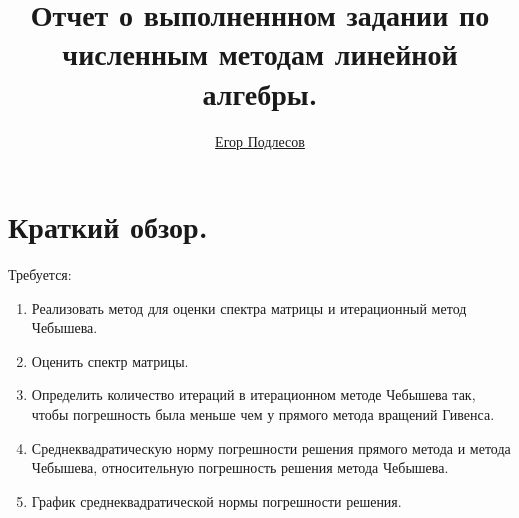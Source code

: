 \documentclass[a4paper,12pt]{article}
\author{\href{https://github.com/ypodlesov}{Егор Подлесов}}
\title{Отчет о выполненнном задании по численным методам линейной алгебры.}
\begin{document}
\maketitle
\clearpage

\section*{Краткий обзор.}
Требуется:
\begin{enumerate}
    \item Реализовать метод для оценки спектра матрицы и итерационный метод Чебышева. 
    \item Оценить спектр матрицы.
    \item Определить количество итераций в итерационном методе Чебышева так, чтобы погрешность была меньше чем у прямого метода вращений Гивенса.
    \item Среднеквадратическую норму погрешности решения прямого метода и метода Чебышева, относительную погрешность решения метода Чебышева.
    \item График среднеквадратической нормы погрешности решения.
\end{enumerate}
\end{document}
